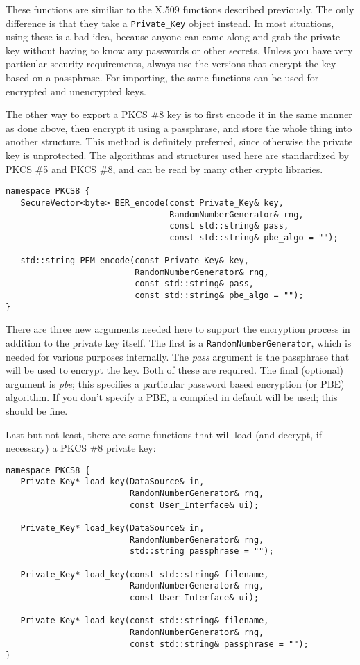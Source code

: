 \documentclass{article}
\newcommand{\type}[1]{\texttt{#1}}
\renewcommand{\arg}[1]{\textsl{#1}}
\begin{document}
These functions are similiar to the X.509 functions described
previously. The only difference is that they take a
\type{Private\_Key} object instead. In most situations, using these is
a bad idea, because anyone can come along and grab the private key
without having to know any passwords or other secrets. Unless you have
very particular security requirements, always use the versions that
encrypt the key based on a passphrase. For importing, the same
functions can be used for encrypted and unencrypted keys.

The other way to export a PKCS \#8 key is to first encode it in the
same manner as done above, then encrypt it using a passphrase, and
store the whole thing into another structure. This method is
definitely preferred, since otherwise the private key is
unprotected. The algorithms and structures used here are standardized
by PKCS \#5 and PKCS \#8, and can be read by many other crypto
libraries.

\begin{verbatim}
namespace PKCS8 {
   SecureVector<byte> BER_encode(const Private_Key& key,
                                 RandomNumberGenerator& rng,
                                 const std::string& pass,
                                 const std::string& pbe_algo = "");

   std::string PEM_encode(const Private_Key& key,
                          RandomNumberGenerator& rng,
                          const std::string& pass,
                          const std::string& pbe_algo = "");
}
\end{verbatim}

There are three new arguments needed here to support the encryption
process in addition to the private key itself. The first is a
\type{RandomNumberGenerator}, which is needed for various purposes
internally. The \arg{pass} argument is the passphrase that will be
used to encrypt the key. Both of these are required. The final
(optional) argument is \arg{pbe}; this specifies a particular password
based encryption (or PBE) algorithm. If you don't specify a PBE,
a compiled in default will be used; this should be fine.

Last but not least, there are some functions that will load (and
decrypt, if necessary) a PKCS \#8 private key:

\begin{verbatim}
namespace PKCS8 {
   Private_Key* load_key(DataSource& in,
                         RandomNumberGenerator& rng,
                         const User_Interface& ui);

   Private_Key* load_key(DataSource& in,
                         RandomNumberGenerator& rng,
                         std::string passphrase = "");

   Private_Key* load_key(const std::string& filename,
                         RandomNumberGenerator& rng,
                         const User_Interface& ui);

   Private_Key* load_key(const std::string& filename,
                         RandomNumberGenerator& rng,
                         const std::string& passphrase = "");
}
\end{verbatim}
\end{document}
